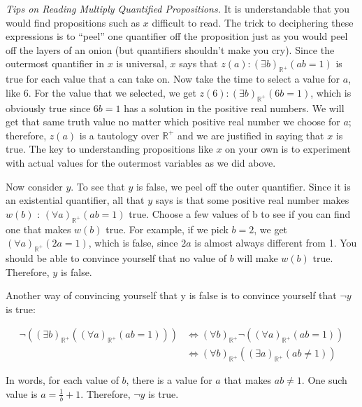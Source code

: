 \documentclass[10pt,]{book}
\theoremstyle{plain}
\theoremstyle{definition}
\theoremstyle{definition}
\theoremstyle{definition}
\theoremstyle{definition}
\begin{document}
\par
\emph{Tips on Reading Multiply Quantified Propositions.}
It is understandable that you would find propositions such as \(x\) difficult to read. The trick to deciphering these expressions is to ``peel'' one quantifier off the proposition just as you would peel off the layers of an onion (but quantifiers shouldn't make you cry). Since the outermost quantifier in \(x\) is universal, \(x\) says that \(z(a) : (\exists  b)_{\mathbb{R}^+}(a b = 1)\) is true for each value that a can take on. Now take the time to select a value for \(a\), like 6. For the value that we selected, we get \(z(6) : (\exists b)_{\mathbb{R}^+}(6b = 1)\), which is obviously true since \(6b = 1\) has a solution in the positive real numbers. We will get that same truth value no matter which positive
real number we choose for \(a\); therefore, \(z(a)\) is a tautology over \(\mathbb{R}^+\) and we are justified in saying that \(x\) is true. The key to understanding propositions like \(x\) on your own is to experiment with actual values for the outermost variables as we did above.%
\par
Now consider \(y\). To see that \(y\) is false, we peel off the outer quantifier. Since it is an existential quantifier, all that \(y\) says is that some positive real number makes \(w(b)\) : \((\forall a) _{\mathbb{R}^+} (a b = 1)\) true. Choose a few values of b to see if you can find one that makes \(w(b)\) true. For example, if we pick \(b = 2\), we get \((\forall a) _{\mathbb{R}^+}(2a = 1)\), which is false, since \(2a\) is almost always different from 1. You should be able to convince yourself that no value of \(b\) will make \(w(b)\) true.  Therefore, \(y\) is false.%
\par
Another way of convincing yourself that y is false is to convince yourself that \(\neg y\) is true:

\begin{equation*}
\begin{split}
\neg ((\exists  b)_{\mathbb{R}^+} ((\forall a)_{\mathbb{R}^+}(a b = 1))) 
	&\Leftrightarrow (\forall  b)_{\mathbb{R}^+}\neg ((\forall a)_{\mathbb{R}^+}(a b = 1))\\
	& \Leftrightarrow (\forall  b)_{\mathbb{R}^+} ((\exists a)_{\mathbb{R}^+}(a b \neq  1))
\end{split}
\end{equation*}



In words, for each value of \(b\), there is a value for \(a\) that makes \(a b \neq  1\).  One such value is \(a=\frac{1}{b}+1\).  Therefore,  \(\neg y\) is true.%
\typeout{************************************************}
\typeout{************************************************}
\end{document}
